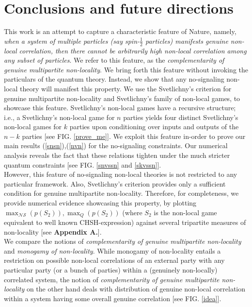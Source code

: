 \documentclass[%
 reprint,
 amsmath,amssymb,
 aps,
]{revtex4-1}
\theoremstyle{plain}
\begin{document}
\section{Conclusions and future directions}
This work is an attempt to capture a characteristic feature of Nature, namely, \textit{when a system of multiple particles (say spin-$\frac{1}{2}$ particles) manifests genuine non-local correlation, then there cannot be arbitrarily high non-local correlation among any subset of particles}. We refer to this feature, as the \textit{complementarity of genuine multipartite non-locality}. We bring forth this feature without invoking the particulars of the quantum theory. Instead, we show that any no-signaling non-local theory will manifest this property. We use the Svetlichny's criterion for genuine multipartite non-locality and Svetlichny's family of non-local games, to showcase this feature. Svetlichny's non-local games have a recursive structure; i.e., a Svetlichny's non-local game for $n$ parties yields four distinct Svetlichny's non-local games for $k$ parties upon conditioning over inputs and outputs of the $n-k$ parties [see FIG. \ref{prove_me}]. We exploit this feature in-order to prove our main results (\ref{snsn}),(\ref{nvn}) for the no-signaling constraints. Our numerical analysis reveals the fact that these relations tighten under the much stricter quantum constraints [see FIG. \ref{snvssn} and \ref{skvssn}]. \\
However, this feature of no-signaling non-local theories is not restricted to any particular framework. Also, Svetlichny's criterion provides only a sufficient condition for genuine multipartite non-locality. Therefore, for completeness, we provide numerical evidence showcasing this property, by plotting $\max_{\mathcal{NS}}(p(S_2)),\max_{Q}(p(S_2))$ (where $S_2$ is the non-local game equivalent to well known CHSH-expression) against several tripartite measures of non-locality [see \textbf{Appendix A.}]. \\
We compare the notions of \textit{complementarity of genuine multipartite non-locality} and \textit{monogamy of non-locality}. While monogamy of non-locality entails a restriction on possible non-local correlations of an external party with any particular party (or a bunch of parties) within a (genuinely non-locally) 
correlated system, the notion of \textit{complementarity of genuine multipartite non-locality} on the other hand deals with distribution of genuine non-local correlation within a system having some overall genuine correlation [see FIG. \ref{idea}].
\end{document}
